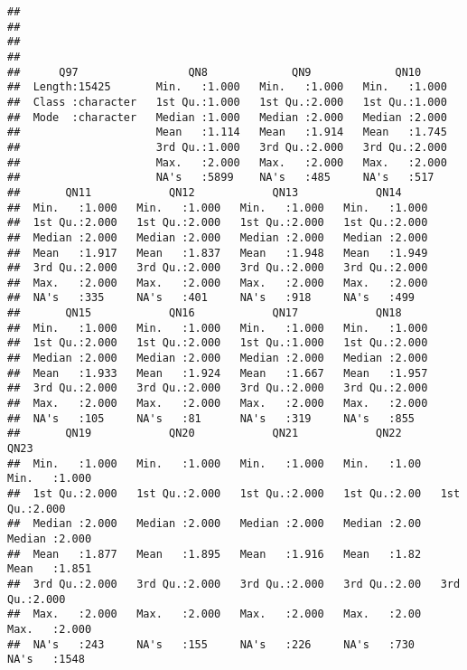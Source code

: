 \documentclass[
]{article}
\begin{document}
\begin{verbatim}
##                                                                             
##                                                                             
##                                                                             
##                                                                             
##      Q97                 QN8             QN9             QN10      
##  Length:15425       Min.   :1.000   Min.   :1.000   Min.   :1.000  
##  Class :character   1st Qu.:1.000   1st Qu.:2.000   1st Qu.:1.000  
##  Mode  :character   Median :1.000   Median :2.000   Median :2.000  
##                     Mean   :1.114   Mean   :1.914   Mean   :1.745  
##                     3rd Qu.:1.000   3rd Qu.:2.000   3rd Qu.:2.000  
##                     Max.   :2.000   Max.   :2.000   Max.   :2.000  
##                     NA's   :5899    NA's   :485     NA's   :517    
##       QN11            QN12            QN13            QN14      
##  Min.   :1.000   Min.   :1.000   Min.   :1.000   Min.   :1.000  
##  1st Qu.:2.000   1st Qu.:2.000   1st Qu.:2.000   1st Qu.:2.000  
##  Median :2.000   Median :2.000   Median :2.000   Median :2.000  
##  Mean   :1.917   Mean   :1.837   Mean   :1.948   Mean   :1.949  
##  3rd Qu.:2.000   3rd Qu.:2.000   3rd Qu.:2.000   3rd Qu.:2.000  
##  Max.   :2.000   Max.   :2.000   Max.   :2.000   Max.   :2.000  
##  NA's   :335     NA's   :401     NA's   :918     NA's   :499    
##       QN15            QN16            QN17            QN18      
##  Min.   :1.000   Min.   :1.000   Min.   :1.000   Min.   :1.000  
##  1st Qu.:2.000   1st Qu.:2.000   1st Qu.:1.000   1st Qu.:2.000  
##  Median :2.000   Median :2.000   Median :2.000   Median :2.000  
##  Mean   :1.933   Mean   :1.924   Mean   :1.667   Mean   :1.957  
##  3rd Qu.:2.000   3rd Qu.:2.000   3rd Qu.:2.000   3rd Qu.:2.000  
##  Max.   :2.000   Max.   :2.000   Max.   :2.000   Max.   :2.000  
##  NA's   :105     NA's   :81      NA's   :319     NA's   :855    
##       QN19            QN20            QN21            QN22           QN23      
##  Min.   :1.000   Min.   :1.000   Min.   :1.000   Min.   :1.00   Min.   :1.000  
##  1st Qu.:2.000   1st Qu.:2.000   1st Qu.:2.000   1st Qu.:2.00   1st Qu.:2.000  
##  Median :2.000   Median :2.000   Median :2.000   Median :2.00   Median :2.000  
##  Mean   :1.877   Mean   :1.895   Mean   :1.916   Mean   :1.82   Mean   :1.851  
##  3rd Qu.:2.000   3rd Qu.:2.000   3rd Qu.:2.000   3rd Qu.:2.00   3rd Qu.:2.000  
##  Max.   :2.000   Max.   :2.000   Max.   :2.000   Max.   :2.00   Max.   :2.000  
##  NA's   :243     NA's   :155     NA's   :226     NA's   :730    NA's   :1548   

\end{verbatim}
\end{document}
